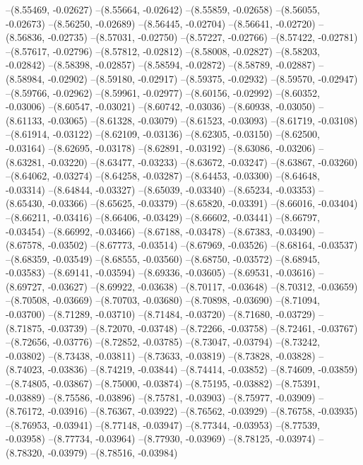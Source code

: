 --(8.55469, -0.02627)
--(8.55664, -0.02642)
--(8.55859, -0.02658)
--(8.56055, -0.02673)
--(8.56250, -0.02689)
--(8.56445, -0.02704)
--(8.56641, -0.02720)
--(8.56836, -0.02735)
--(8.57031, -0.02750)
--(8.57227, -0.02766)
--(8.57422, -0.02781)
--(8.57617, -0.02796)
--(8.57812, -0.02812)
--(8.58008, -0.02827)
--(8.58203, -0.02842)
--(8.58398, -0.02857)
--(8.58594, -0.02872)
--(8.58789, -0.02887)
--(8.58984, -0.02902)
--(8.59180, -0.02917)
--(8.59375, -0.02932)
--(8.59570, -0.02947)
--(8.59766, -0.02962)
--(8.59961, -0.02977)
--(8.60156, -0.02992)
--(8.60352, -0.03006)
--(8.60547, -0.03021)
--(8.60742, -0.03036)
--(8.60938, -0.03050)
--(8.61133, -0.03065)
--(8.61328, -0.03079)
--(8.61523, -0.03093)
--(8.61719, -0.03108)
--(8.61914, -0.03122)
--(8.62109, -0.03136)
--(8.62305, -0.03150)
--(8.62500, -0.03164)
--(8.62695, -0.03178)
--(8.62891, -0.03192)
--(8.63086, -0.03206)
--(8.63281, -0.03220)
--(8.63477, -0.03233)
--(8.63672, -0.03247)
--(8.63867, -0.03260)
--(8.64062, -0.03274)
--(8.64258, -0.03287)
--(8.64453, -0.03300)
--(8.64648, -0.03314)
--(8.64844, -0.03327)
--(8.65039, -0.03340)
--(8.65234, -0.03353)
--(8.65430, -0.03366)
--(8.65625, -0.03379)
--(8.65820, -0.03391)
--(8.66016, -0.03404)
--(8.66211, -0.03416)
--(8.66406, -0.03429)
--(8.66602, -0.03441)
--(8.66797, -0.03454)
--(8.66992, -0.03466)
--(8.67188, -0.03478)
--(8.67383, -0.03490)
--(8.67578, -0.03502)
--(8.67773, -0.03514)
--(8.67969, -0.03526)
--(8.68164, -0.03537)
--(8.68359, -0.03549)
--(8.68555, -0.03560)
--(8.68750, -0.03572)
--(8.68945, -0.03583)
--(8.69141, -0.03594)
--(8.69336, -0.03605)
--(8.69531, -0.03616)
--(8.69727, -0.03627)
--(8.69922, -0.03638)
--(8.70117, -0.03648)
--(8.70312, -0.03659)
--(8.70508, -0.03669)
--(8.70703, -0.03680)
--(8.70898, -0.03690)
--(8.71094, -0.03700)
--(8.71289, -0.03710)
--(8.71484, -0.03720)
--(8.71680, -0.03729)
--(8.71875, -0.03739)
--(8.72070, -0.03748)
--(8.72266, -0.03758)
--(8.72461, -0.03767)
--(8.72656, -0.03776)
--(8.72852, -0.03785)
--(8.73047, -0.03794)
--(8.73242, -0.03802)
--(8.73438, -0.03811)
--(8.73633, -0.03819)
--(8.73828, -0.03828)
--(8.74023, -0.03836)
--(8.74219, -0.03844)
--(8.74414, -0.03852)
--(8.74609, -0.03859)
--(8.74805, -0.03867)
--(8.75000, -0.03874)
--(8.75195, -0.03882)
--(8.75391, -0.03889)
--(8.75586, -0.03896)
--(8.75781, -0.03903)
--(8.75977, -0.03909)
--(8.76172, -0.03916)
--(8.76367, -0.03922)
--(8.76562, -0.03929)
--(8.76758, -0.03935)
--(8.76953, -0.03941)
--(8.77148, -0.03947)
--(8.77344, -0.03953)
--(8.77539, -0.03958)
--(8.77734, -0.03964)
--(8.77930, -0.03969)
--(8.78125, -0.03974)
--(8.78320, -0.03979)
--(8.78516, -0.03984)
